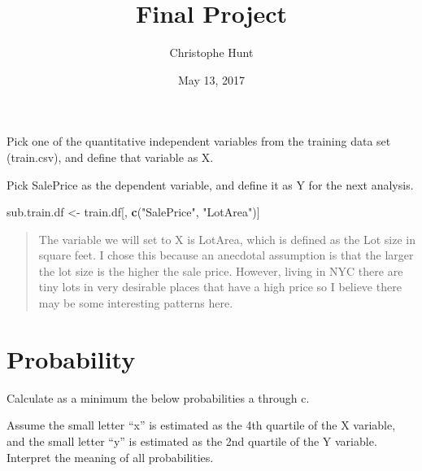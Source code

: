 \documentclass[]{article}
\title{Final Project}
\author{Christophe Hunt}
\date{May 13, 2017}
\newenvironment{Shaded}{\begin{snugshade}}{\end{snugshade}}
\newcommand{\KeywordTok}[1]{\textcolor[rgb]{0.13,0.29,0.53}{\textbf{{#1}}}}
\newcommand{\StringTok}[1]{\textcolor[rgb]{0.31,0.60,0.02}{{#1}}}
\newcommand{\NormalTok}[1]{{#1}}
\begin{document}
\maketitle

{
\setcounter{tocdepth}{2}
\tableofcontents
}
Pick one of the quantitative independent variables from the training
data set (train.csv), and define that variable as X.

Pick SalePrice as the dependent variable, and define it as Y for the
next analysis.

\begin{Shaded}
\end{Shaded}

\begin{Shaded}
\begin{Highlighting}[]
\NormalTok{sub.train.df <-}\StringTok{ }\NormalTok{train.df[, }\KeywordTok{c}\NormalTok{(}\StringTok{"SalePrice"}\NormalTok{, }\StringTok{"LotArea"}\NormalTok{)]}
\end{Highlighting}
\end{Shaded}

\begin{quote}
The variable we will set to X is LotArea, which is defined as the Lot
size in square feet. I chose this because an anecdotal assumption is
that the larger the lot size is the higher the sale price. However,
living in NYC there are tiny lots in very desirable places that have a
high price so I believe there may be some interesting patterns here.
\end{quote}

\section{Probability}\label{probability}

Calculate as a minimum the below probabilities a through c.

Assume the small letter ``x'' is estimated as the 4th quartile of the X
variable, and the small letter ``y'' is estimated as the 2nd quartile of
the Y variable. Interpret the meaning of all probabilities.
\end{document}
